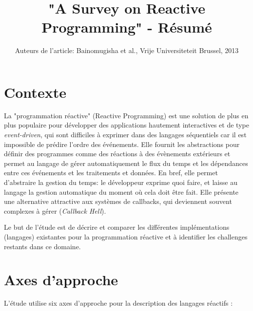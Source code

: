 \documentclass[10pt,final]{IEEEtran}
\begin{document}

\title{"A Survey on Reactive Programming" - Résumé}

\author{Auteurs de l'article: Bainomugisha et al., Vrije Universiteteit Brussel, 2013\vspace{-4.5ex}}

\maketitle

\section{Contexte}

La "programmation réactive" (Reactive Programming) est une solution de plus en plus populaire pour développer des applications hautement interactives et de type \textit{event-driven}, qui sont difficiles à exprimer dans des langages séquentiels car il est impossible de prédire l'ordre des événements. Elle fournit les abstractions pour définir des programmes comme des réactions à des évènements extérieurs et permet au langage de gérer automatiquement le flux du temps et les dépendances entre ces événements et les traitements et données. En bref, elle permet d'abstraire la gestion du temps: le développeur exprime quoi faire, et laisse au langage la gestion automatique du moment où cela doit être fait. Elle présente une alternative attractive aux systèmes de callbacks, qui deviennent souvent complexes à gérer (\textit{Callback Hell}).

Le but de l'étude est de décrire et comparer les différentes implémentations (langages) existantes pour la programmation réactive et à identifier les challenges restants dans ce domaine.

\section{Axes d'approche}
L'étude utilise six axes d'approche pour la description des langages réactifs :
\end{document}
